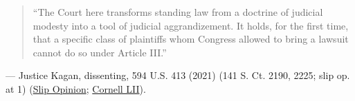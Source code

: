 \documentclass[12pt]{article}
\begin{document}
\begin{quote}
``The Court here transforms standing law from a doctrine of judicial modesty into a tool of judicial aggrandizement. It holds, for the first time, that a specific class of plaintiffs whom Congress allowed to bring a lawsuit cannot do so under Article III.''
\end{quote}
\noindent --- Justice Kagan, dissenting, 594 U.S. 413 (2021) (141 S. Ct. 2190, 2225; slip op. at 1) (\href{https://www.supremecourt.gov/opinions/20pdf/20-297_4g25.pdf}{Slip Opinion}; \href{https://www.law.cornell.edu/supremecourt/text/20-297}{Cornell LII}).
\end{document}

